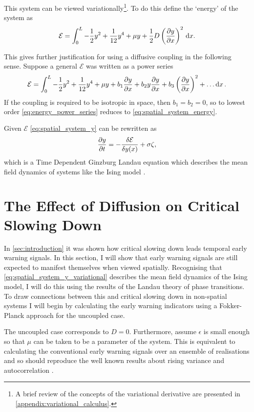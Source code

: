This system can be viewed variationally\footnote{A brief review of the concepts of the variational derivative are presented in \cref{appendix:variational_calculus}.}.
To do this define the `energy' of the system as
\begin{equation}
  \label{eq:spatial_system_energy}
  \mathcal{E} = \int_0^L -\frac{1}{2}y^2 + \frac{1}{12}y^4 + \mu y + \frac{1}{2}D\left(\pdv{y}{x}\right)^2\,\mathrm{d}{x}.
\end{equation}

This gives further justification for using a diffusive coupling in the following sense. Suppose a general $\mathcal{E}$ was written as a power series
\begin{equation}
  \label{eq:energy_power_series}
  \mathcal{E} = \int_0^L  -\frac{1}{2}y^2 + \frac{1}{12}y^4 + \mu y + b_1 \pdv{y}{x} + b_2 y \pdv{y}{x} + b_3 \left(\pdv{y}{x}\right)^2 + \ldots \dd{x}.
\end{equation}
If the coupling is required to be isotropic in space, then $b_1 = b_2 = 0$, so to lowest order \cref{eq:energy_power_series} reduces to
\cref{eq:spatial_system_energy}.

Given $\mathcal{E}$ \cref{eq:spatial_system_y} can be rewritten as
\begin{equation}
  \label{eq:spatial_system_y_variational}
    \pdv{y}{t} = -\fdv{\mathcal{E}}{y(x)}  + \sigma\zeta, 
\end{equation}
which is a Time Dependent Ginzburg Landau equation which describes the mean field dynamics of systems like the Ising model \parencite{Goldenfeld1992}.

\section{The Effect of Diffusion on Critical Slowing Down}
\label{sec:spatial_csd}
In \cref{sec:introduction} it was shown how critical slowing down leads temporal early warning signals. In this section, I will show that early warning signals are still expected
to manifest themselves when viewed spatially. Recognising that \cref{eq:spatial_system_y_variational} describes the mean field dynamics of
the Ising model, I will do this using the results of the Landau theory of phase transitions. To draw connections between this and critical slowing down in non-spatial systems
I will begin by calculating the early warning indicators using a Fokker-Planck approach for the uncoupled case.

The uncoupled case corresponds to  $D = 0$. Furthermore, assume $\epsilon$ is small enough so that $\mu$ can be taken to be a parameter of the system.
This is equivalent to calculating the conventional early warning signals over an ensemble of realisations and so should reproduce the well known results about rising variance
and autocorrelation \parencite{Dakos2008}.

